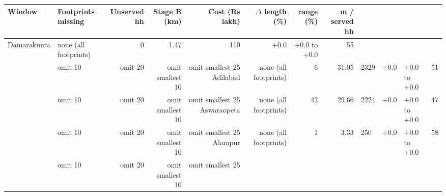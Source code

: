 \begin{tabular}{llrrrrrr}
\hline
Window & Footprints missing & Unserved hh & Stage B (km) & Cost (Rs lakh) & $\Delta$ length (\%) & range (\%) & m / served hh \\
\hline
Damarakunta & none (all footprints) & 0 & 1.47 & 110 & +0.0 & +0.0 to +0.0 & 55 \\
 & omit 10%
 & omit 20%
 & omit smallest 10%
 & omit smallest 25%
\hline
Adilabad & none (all footprints) & 6 & 31.05 & 2329 & +0.0 & +0.0 to +0.0 & 51 \\
 & omit 10%
 & omit 20%
 & omit smallest 10%
 & omit smallest 25%
\hline
Aswaraopeta & none (all footprints) & 42 & 29.66 & 2224 & +0.0 & +0.0 to +0.0 & 47 \\
 & omit 10%
 & omit 20%
 & omit smallest 10%
 & omit smallest 25%
\hline
Alampur & none (all footprints) & 1 & 3.33 & 250 & +0.0 & +0.0 to +0.0 & 58 \\
 & omit 10%
 & omit 20%
 & omit smallest 10%
 & omit smallest 25%
\hline
\end{tabular}
